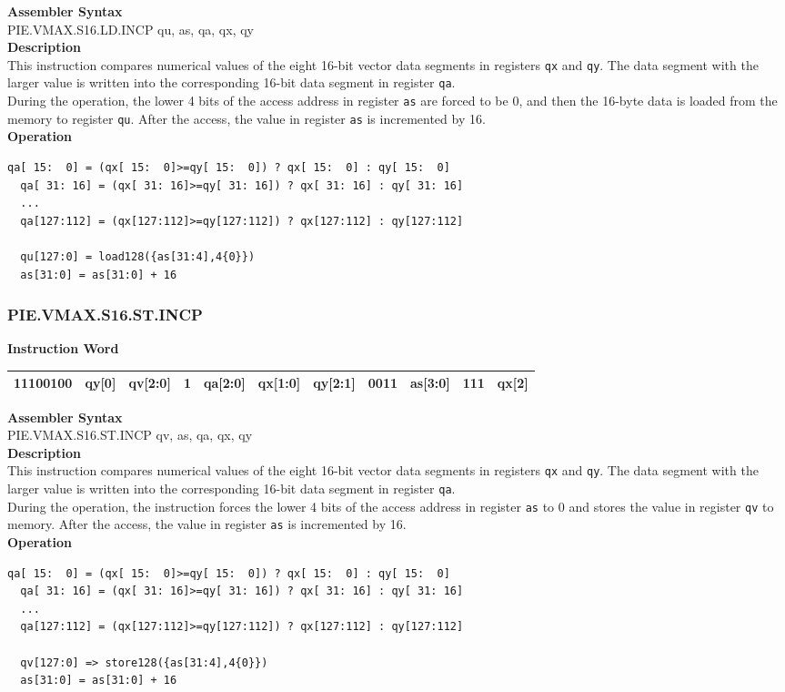 \textbf{Assembler Syntax} \\
PIE.VMAX.S16.LD.INCP qu, as, qa, qx, qy \\
\textbf{Description} \\
This instruction compares numerical values of the eight 16-bit vector data segments in registers \lstinline{qx} and \lstinline{qy}. The data segment with the larger value is written into the corresponding 16-bit data segment in register \lstinline{qa}.\\
During the operation, the lower 4 bits of the access address in register \lstinline{as} are forced to be 0, and then the 16-byte data is loaded from the memory to register \lstinline{qu}. After the access, the value in register \lstinline{as} is incremented by 16.\\
\textbf{Operation}
\begin{lstlisting}[escapeinside=`?]
  qa[ 15:  0] = (qx[ 15:  0]>=qy[ 15:  0]) ? qx[ 15:  0] : qy[ 15:  0]
  qa[ 31: 16] = (qx[ 31: 16]>=qy[ 31: 16]) ? qx[ 31: 16] : qy[ 31: 16]
  ...
  qa[127:112] = (qx[127:112]>=qy[127:112]) ? qx[127:112] : qy[127:112]

  qu[127:0] = load128({as[31:4],4{0}})
  as[31:0] = as[31:0] + 16
\end{lstlisting}

\newpage
\subsubsection{PIE.VMAX.S16.ST.INCP}\label{instruction:PIEVMAXS16STINCP}
\setlength\tabcolsep{6pt}
\textbf{Instruction Word} \\
\begin{tabular}{|c|c|c|c|c|c|c|c|c|c|c|}
	\hline
	11100100 & qy[0] & qv[2:0] & 1 & qa[2:0] & qx[1:0] & qy[2:1] & 0011 & as[3:0] & 111 & qx[2] \\
	\hline
\end{tabular}

\textbf{Assembler Syntax} \\
PIE.VMAX.S16.ST.INCP qv, as, qa, qx, qy \\
\textbf{Description} \\
This instruction compares numerical values of the eight 16-bit vector data segments in registers \lstinline{qx} and \lstinline{qy}. The data segment with the larger value is written into the corresponding 16-bit data segment in register \lstinline{qa}.\\
During the operation, the instruction forces the lower 4 bits of the access address in register \lstinline{as} to 0 and stores the value in register \lstinline{qv} to memory. After the access, the value in register \lstinline{as} is incremented by 16.\\
\textbf{Operation}
\begin{lstlisting}[escapeinside=`?]
  qa[ 15:  0] = (qx[ 15:  0]>=qy[ 15:  0]) ? qx[ 15:  0] : qy[ 15:  0]
  qa[ 31: 16] = (qx[ 31: 16]>=qy[ 31: 16]) ? qx[ 31: 16] : qy[ 31: 16]
  ...
  qa[127:112] = (qx[127:112]>=qy[127:112]) ? qx[127:112] : qy[127:112]

  qv[127:0] => store128({as[31:4],4{0}})
  as[31:0] = as[31:0] + 16
\end{lstlisting}


